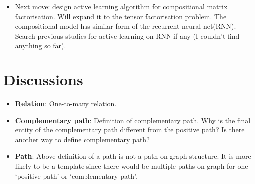 \documentclass{article}
\theoremstyle{definition}
\begin{document}
\begin{itemize}
\item Next move: design active learning algorithm for compositional matrix factorisation\cite{silva2012active}. Will expand it to the tensor factorisation problem. The compositional model has similar form of the recurrent neural net(RNN). Search previous studies for active learning on RNN if any (I couldn't find anything so far).

\end{itemize}

\section{Discussions}
\begin{itemize}
\item \textbf{Relation}: One-to-many relation.

\item \textbf{Complementary path}: Definition of complementary path. Why is the final entity of the complementary path different from the positive path? Is there another way to define complementary path?

\item \textbf{Path}: Above definition of a path is not a path on graph structure. It is more likely to be a template since there would be multiple paths on graph for one `positive path' or `complementary path'.
\end{itemize}




\end{document}
